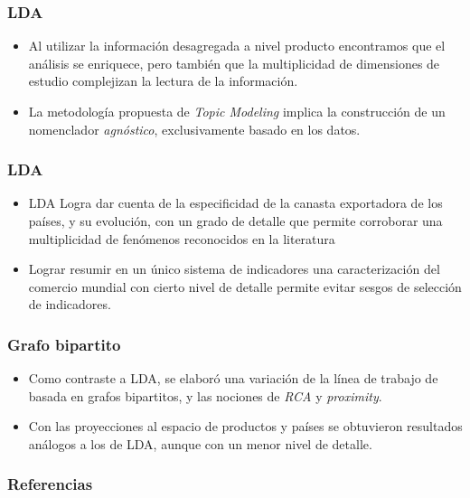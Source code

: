 \documentclass[compress]{beamer}
\begin{document}
\begin{frame}
\frametitle{LDA}
\begin{itemize}[label=\faRebel]
	\item Al utilizar la información desagregada a nivel producto encontramos que el análisis se enriquece, pero también que la multiplicidad de dimensiones de estudio complejizan la lectura de la información. 
	\item La metodología propuesta de \textit{Topic Modeling} implica la construcción de un nomenclador \textit{agnóstico}, exclusivamente basado en los datos.
\end{itemize}
\end{frame}

\begin{frame}
\frametitle{LDA}
\begin{itemize}[label=\faRebel]

	\item LDA Logra dar cuenta de la especificidad de la canasta exportadora de los países, y su evolución, con un grado de detalle que permite corroborar una multiplicidad de fenómenos reconocidos en la literatura
	\item Lograr resumir en un único sistema de indicadores una caracterización del comercio mundial con cierto nivel de detalle permite evitar sesgos de selección de indicadores.
\end{itemize}
\end{frame}

\begin{frame}
\frametitle{Grafo bipartito}
\begin{itemize}[label=\faRebel]
	\item Como contraste a LDA, se elaboró una variación de la línea de trabajo de \cite{Hidalgo2007} basada en grafos bipartitos, y las nociones de  \textit{RCA} y \textit{proximity}. 
	\item Con las proyecciones al espacio de productos y países se obtuvieron resultados análogos a los de LDA, aunque con un menor nivel de detalle.
\end{itemize}
\end{frame}

\begin{frame}
	\frametitle{Referencias}

	\tiny

	
\end{frame}
\end{document}
